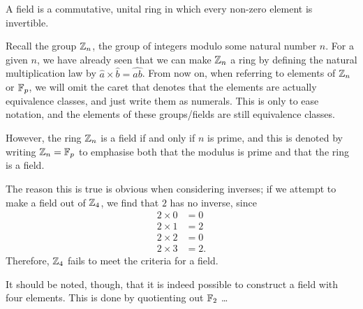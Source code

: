 \begin{definition}
	A field is a commutative, unital ring in which every non-zero element is invertible.
\end{definition}
Recall the group $\zn$, the group of integers modulo some natural number $n$.
For a given $n$, we have already seen that we can make $\zn$ a ring by defining the natural multiplication law by $\widehat{a} \times \widehat{b} = \widehat{ab}$.
From now on, when referring to elements of $\zn$ or $\fp$, we will omit the caret that denotes that the elements are actually equivalence classes, and just write them as numerals.
This is only to ease notation, and the elements of these groups/fields are still equivalence classes.

However, the ring $\zn$ is a field if and only if $n$ is prime, and this is denoted
by writing $\zn = \fp$ to emphasise both that the modulus is prime and
that the ring is a field.  

The reason this is true is obvious when considering inverses; if we attempt to make a field out of $\zn[4]$, we find that $2$ has no inverse, since
\begin{align*}
	2 \times 0 &= 0\\
	2 \times 1 &= 2\\
	2 \times 2 &= 0\\
	2 \times 3 &= 2.
\end{align*}
Therefore, $\zn[4]$ fails to meet the criteria for a field.

It should be noted, though, that it is indeed possible to construct a field with four elements.
This is done by quotienting out $\fp[2]$ \ldots %

